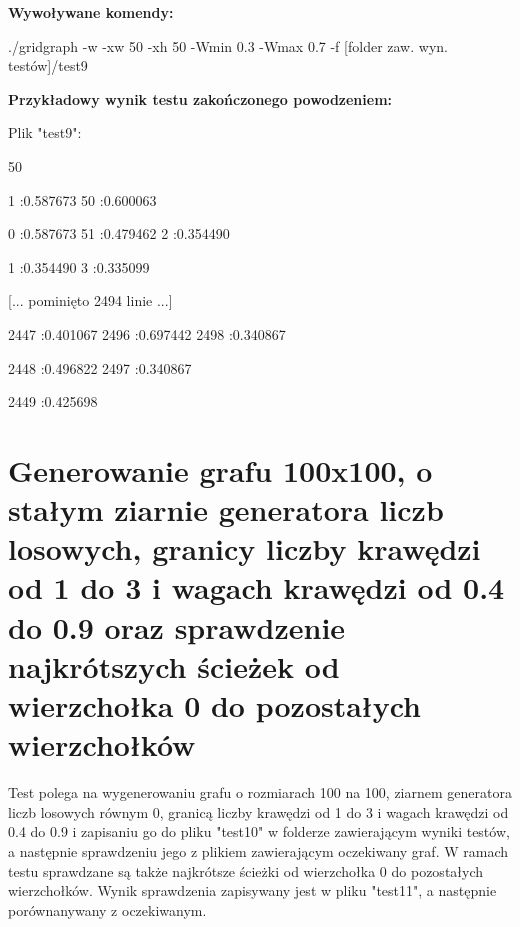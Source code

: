 \documentclass[11pt,a4paper]{report}
\newenvironment{multiconsole}{\begingroup\fontfamily{qcr}\selectfont}{\endgroup}
\begin{document}
    \vspace{2em}

    \textbf{Wywoływane komendy:}

    \vspace{1em}

    \begin{multiconsole}
        ./gridgraph -w -xw 50 -xh 50 -Wmin 0.3 -Wmax 0.7 -f [folder zaw. wyn. testów]/test9
    \end{multiconsole}

    \vspace{2em}

    \textbf{Przykładowy wynik testu zakończonego powodzeniem:}

    \vspace{1em}

    Plik "test9":

    \begin{multiconsole}
        50 50

        \hspace{2em}1 :0.587673  50 :0.600063

        \hspace{2em}0 :0.587673  51 :0.479462  2 :0.354490 

        \hspace{2em}1 :0.354490  3 :0.335099 

        [... pominięto 2494 linie ...]

        \hspace{2em}2447 :0.401067  2496 :0.697442  2498 :0.340867 

        \hspace{2em}2448 :0.496822  2497 :0.340867 

        \hspace{2em}2449 :0.425698
    \end{multiconsole}


    \newpage
    \section{Generowanie grafu 100x100, o stałym ziarnie generatora liczb losowych, granicy liczby krawędzi od 1 do 3 i wagach krawędzi od 0.4 do 0.9 oraz sprawdzenie najkrótszych ścieżek od wierzchołka 0 do pozostałych wierzchołków}

    Test polega na wygenerowaniu grafu o rozmiarach 100 na 100, ziarnem generatora liczb losowych równym 0, granicą liczby krawędzi od 1 do 3 i wagach krawędzi od 0.4 do 0.9 i zapisaniu go do pliku "test10" w folderze zawierającym wyniki testów, a następnie sprawdzeniu jego z plikiem zawierającym oczekiwany graf. W ramach testu sprawdzane są także najkrótsze ścieżki od wierzchołka 0 do pozostałych wierzchołków. Wynik sprawdzenia zapisywany jest w pliku "test11", a następnie porównanywany z oczekiwanym.
\end{document}
